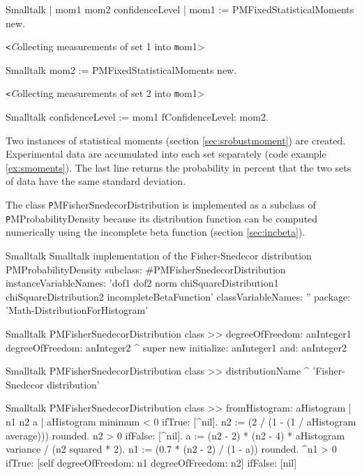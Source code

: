 \label{exs:Ftest}
\begin{displaycode}{Smalltalk}
 | mom1 mom2 confidenceLevel |
 mom1 := PMFixedStatisticalMoments new.
\end{displaycode}

\hfil{\texttt<\textsl Collecting measurements of set 1 into \texttt
mom1>}\hfil
\begin{displaycode}{Smalltalk}
 mom2 := PMFixedStatisticalMoments new.
\end{displaycode}
\hfil{\texttt<\textsl Collecting measurements of set 2 into \texttt
mom1>}\hfil
\begin{displaycode}{Smalltalk}
 confidenceLevel := mom1 fConfidenceLevel: mom2.
\end{displaycode}

Two instances of statistical moments (\cf section
\ref{sec:srobustmoment}) are created. Experimental data are
accumulated into each set separately (\cf code example
\ref{ex:smoments}). The last line returns the probability in
percent that the two sets of data have the same standard
deviation.

The class {\texttt PMFisherSnedecorDistribution} is implemented as a
subclass of {\texttt PMProbabilityDensity} because its distribution
function can be computed numerically using the incomplete beta
function (\cf section \ref{sec:incbeta}).

\begin{listing}[label=ls:Fdist]{Smalltalk}
{Smalltalk implementation of the Fisher-Snedecor distribution}
PMProbabilityDensity subclass: #PMFisherSnedecorDistribution
  instanceVariableNames: 'dof1 dof2 norm chiSquareDistribution1
  chiSquareDistribution2 incompleteBetaFunction'
  classVariableNames: ''
  package: 'Math-DistributionForHistogram'
\end{listing}

\begin{displaycode}{Smalltalk}
PMFisherSnedecorDistribution class >> degreeOfFreedom: anInteger1
degreeOfFreedom: anInteger2
    ^ super new initialize: anInteger1 and: anInteger2
\end{displaycode}

\begin{displaycode}{Smalltalk}
PMFisherSnedecorDistribution class >> distributionName
    ^ 'Fisher-Snedecor distribution'
\end{displaycode}

\begin{displaycode}{Smalltalk}
PMFisherSnedecorDistribution class >> fromHistogram: aHistogram
    | n1 n2 a |
    aHistogram minimum < 0 ifTrue: [^nil].
    n2 := (2 / (1 - (1 / aHistogram average))) rounded.
    n2 > 0 ifFalse: [^nil].
    a := (n2 - 2) * (n2 - 4) * aHistogram variance / (n2 squared * 
                                                                   2).
    n1 := (0.7 * (n2 - 2) / (1 - a)) rounded.
    ^n1 > 0 
        ifTrue: [self degreeOfFreedom: n1 degreeOfFreedom: n2]
        ifFalse: [nil]
\end{displaycode}

